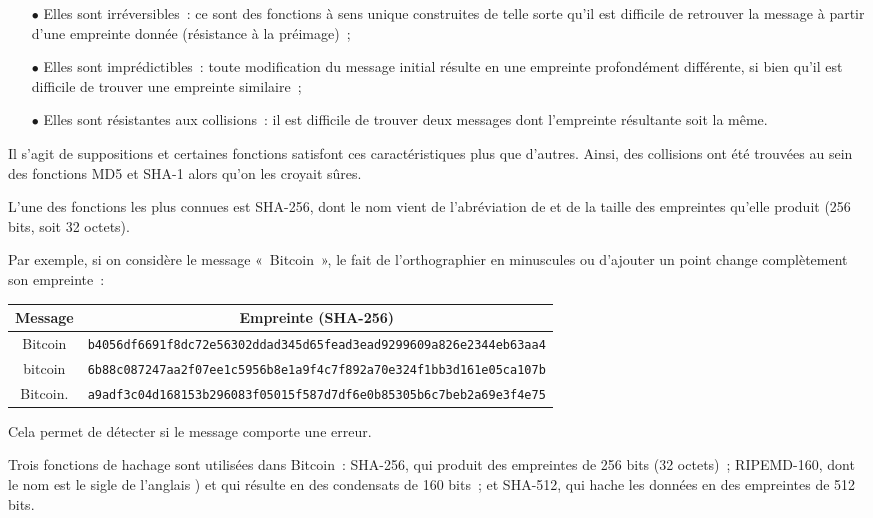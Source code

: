 \begin{itemize}
  \item[$\bullet$] Elles sont irréversibles~: ce sont des fonctions à sens unique construites de telle sorte qu'il est difficile de retrouver la message à partir d'une empreinte donnée (résistance à la préimage)~;
  \item[$\bullet$] Elles sont imprédictibles~: toute modification du message initial résulte en une empreinte profondément différente, si bien qu'il est difficile de trouver une empreinte similaire~;
  \item[$\bullet$] Elles sont résistantes aux collisions~: il est difficile de trouver deux messages dont l'empreinte résultante soit la même. 
\end{itemize}

Il s'agit de suppositions et certaines fonctions satisfont ces caractéristiques plus que d'autres. Ainsi, des collisions ont été trouvées au sein des fonctions MD5 et SHA-1 alors qu'on les croyait sûres.

L'une des fonctions les plus connues est SHA-256, dont le nom vient de l'abréviation de  et de la taille des empreintes qu'elle produit (256 bits, soit 32 octets).

Par exemple, si on considère le message «~Bitcoin~», le fait de l'orthographier en minuscules ou d'ajouter un point change complètement son empreinte~:

\begin{center}
   \begin{tabular}{| c | c | }
     \hline Message & Empreinte (SHA-256) \\
     \hline Bitcoin & \footnotesize \verb?b4056df6691f8dc72e56302ddad345d65fead3ead9299609a826e2344eb63aa4? \\
     \hline bitcoin & \footnotesize \verb?6b88c087247aa2f07ee1c5956b8e1a9f4c7f892a70e324f1bb3d161e05ca107b? \\
     \hline Bitcoin. & \footnotesize \verb?a9adf3c04d168153b296083f05015f587d7df6e0b85305b6c7beb2a69e3f4e75? \\
     \hline
   \end{tabular}
 \end{center}
 
Cela permet de détecter si le message comporte une erreur.

Trois fonctions de hachage sont utilisées dans Bitcoin~: SHA-256, qui produit des empreintes de 256 bits (32 octets)~; RIPEMD-160, dont le nom est le sigle de l'anglais ) et qui résulte en des condensats de 160 bits~; et SHA-512, qui hache les données en des empreintes de 512 bits. 

